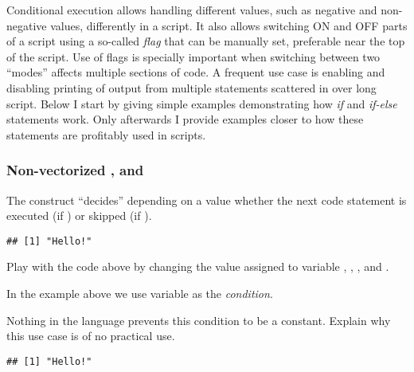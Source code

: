 \documentclass[krantz2]{krantz}\usepackage{knitr}%
\begin{document}
Conditional execution allows handling different values, such as negative and non-negative values, differently in a script. It also allows switching ON and OFF parts of a script using a so-called \emph{flag} that can be manually set, preferable near the top of the script. Use of flags is specially important when switching between two ``modes'' affects multiple sections of code. A frequent use case is enabling and disabling printing of output from multiple statements scattered in over long script. Below I start by giving simple examples demonstrating how \emph{if} and \emph{if-else} statements work. Only afterwards I provide examples closer to how these statements are profitably used in \Rlang scripts.

\subsubsection[Non-vectorized \texttt{if}, \texttt{else} and \texttt{switch}]{Non-vectorized ,  and }
%

The  construct ``decides'' depending on a  value whether the next code statement is executed (if ) or skipped (if ).

\begin{knitrout}\footnotesize
{}\color{fgcolor}\begin{kframe}
\begin{alltt}
 \hlkwb{<-} 
  \hlstd{(}\hlstd{)}
\end{alltt}
\begin{verbatim}
## [1] "Hello!"
\end{verbatim}
\end{kframe}
\end{knitrout}

\begin{playground}
Play with the code above by changing the value assigned to variable , , , and .

In the example above we use variable  as the \emph{condition}.

Nothing in the \Rlang language prevents this condition to be a  constant. Explain why this use case is of no practical use.

\begin{knitrout}\footnotesize
{}\color{fgcolor}\begin{kframe}
\begin{alltt}
 \hlstd{(}\hlstd{)} \hlstd{(}\hlstd{)}
\end{alltt}
\begin{verbatim}
## [1] "Hello!"
\end{verbatim}
\end{kframe}
\end{knitrout}
\end{playground}
\end{document}
